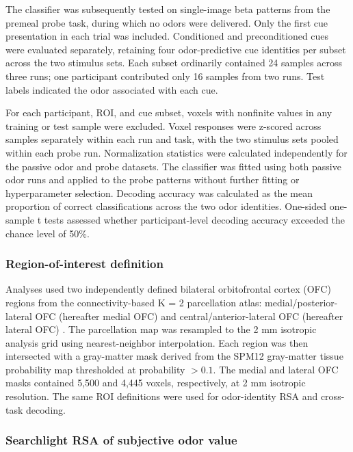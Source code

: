 \documentclass[12pt,letterpaper]{article}
\begin{document}
The classifier was subsequently tested on single-image beta patterns from the premeal probe task, during which no odors were delivered. Only the first cue presentation in each trial was included. Conditioned and preconditioned cues were evaluated separately, retaining four odor-predictive cue identities per subset across the two stimulus sets. Each subset ordinarily contained 24 samples across three runs; one participant contributed only 16 samples from two runs. Test labels indicated the odor associated with each cue.

For each participant, ROI, and cue subset, voxels with nonfinite values in any training or test sample were excluded. Voxel responses were z-scored across samples separately within each run and task, with the two stimulus sets pooled within each probe run. Normalization statistics were calculated independently for the passive odor and probe datasets. The classifier was fitted using both passive odor runs and applied to the probe patterns without further fitting or hyperparameter selection. Decoding accuracy was calculated as the mean proportion of correct classifications across the two odor identities. One-sided one-sample t tests assessed whether participant-level decoding accuracy exceeded the chance level of 50\%.

\subsubsection*{Region-of-interest definition}

Analyses used two independently defined bilateral orbitofrontal cortex (OFC) regions from the connectivity-based K = 2 parcellation atlas: medial/posterior-lateral OFC (hereafter medial OFC) and central/anterior-lateral OFC (hereafter lateral OFC) \citep{kahnt2012connectivity}. The parcellation map was resampled to the 2 mm isotropic analysis grid using nearest-neighbor interpolation. Each region was then intersected with a gray-matter mask derived from the SPM12 gray-matter tissue probability map thresholded at probability $>0.1$. The medial and lateral OFC masks contained 5,500 and 4,445 voxels, respectively, at 2 mm isotropic resolution. The same ROI definitions were used for odor-identity RSA and cross-task decoding.

\subsubsection*{Searchlight RSA of subjective odor value}
\end{document}
